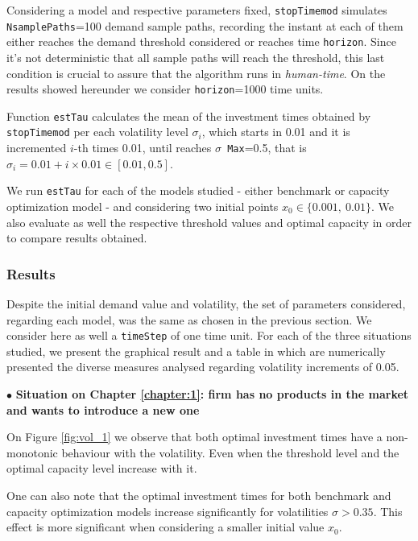 Considering a model and respective parameters fixed, \texttt{stopTimemod} simulates \texttt{NsamplePaths}=100 demand sample paths, recording the instant at each of them either reaches the demand threshold considered or reaches time \texttt{horizon}. Since it's not deterministic that all sample paths will reach the threshold, this last condition is crucial to assure that the algorithm runs in \textit{human-time}. On the results showed hereunder we consider \texttt{horizon}=1000 time units.

Function \texttt{estTau} calculates the mean of the investment times obtained by \texttt{stopTimemod} per each volatility level $\sigma_i$, which starts in 0.01 and it is incremented $i$-th times 0.01, until reaches \texttt{$\sigma$ Max}=0.5, that is $\sigma_i=0.01+i \times 0.01 \in [0.01,0.5]$.

We run \texttt{estTau} for each of the models studied - either benchmark or capacity optimization model - and considering two initial points $x_0 \in \{0.001, \ 0.01 \}$. We also evaluate as well the respective threshold values and optimal capacity in order to compare results obtained.




\subsubsection{Results}

Despite the initial demand value and volatility, the set of parameters considered, regarding each model, was the same as chosen in the previous section. We consider here as well a \texttt{timeStep} of one time unit. For each of the three situations studied, we present the graphical result and a table in which are numerically presented the diverse measures analysed regarding volatility increments of 0.05.

$\bullet$ \textbf{Situation on Chapter \ref{chapter:1}: firm has no products in the market and wants to introduce a new one}

On Figure \ref{fig:vol_1} we observe that both optimal investment times have a non-monotonic behaviour with the volatility. Even when the threshold level and the optimal capacity level increase with it.

One can also note that the optimal investment times for both benchmark and capacity optimization models increase significantly for volatilities $\sigma>0.35$. This effect is more significant when considering a smaller initial value $x_0$.

